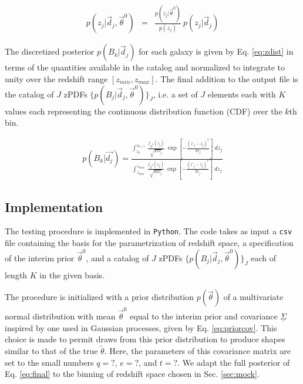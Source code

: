 \documentclass[preprint]{aastex}
\newcommand{\textul}{\underline}
\begin{document}
\begin{eqnarray}
\label{eq:interim}
p(z_{j}|\vec{d}_{j},\vec{\theta}^{0}) &=& \frac{p(z_{j}|\vec{\theta}^{0})}{p(z_{j})}\ p(z_{j}|\vec{d}_{j})
\end{eqnarray}

The discretized posterior $p(B_{k}|\vec{d}_{j})$ for each galaxy is given by Eq. \ref{eq:zdist} in terms of the quantities available in the catalog and normalized to integrate to unity over the redshift range $[z_{min},z_{max}]$.  The final addition to the output file is the catalog of $J$ zPDFs $\{p(B_{j}|\vec{d}_{j},\vec{\theta}^{0})\}_{J}$, i.e. a set of $J$ elements each with $K$ values each representing the continuous distribution function (CDF) over the $k$th bin.

\begin{eqnarray}
\label{eq:zdist}
p(B_{k}|\vec{d_{j}}) = \frac{\int_{z_{k}}^{z_{k+1}}\ \frac{f_{\vec{\theta}^{0}}(z_{j})}{\sqrt{2\pi v_{j}}}\ \exp\left[-\frac{(z'_{j}-z_{j})^{2}}{2v_{j}}\right]\ dz_{j}}{\int_{z_{min}}^{z_{max}}\ \frac{f_{\vec{\theta}^{0}}(z_{j})}{\sqrt{2\pi v_{j}}}\ \exp\left[-\frac{(z'_{j}-z_{j})^{2}}{2v_{j}}\right]\ dz_{j}}
\end{eqnarray}

\clearpage
\subsection{Implementation}
\label{sec:mcmc}

The testing procedure is implemented in \texttt{Python}.  The code takes as input a \texttt{csv} file containing the basis for the parametrization of redshift space, a specification of the interim prior $\vec{\theta}^{0}$, and a catalog of $J$ zPDFs $\{p(B_{j}|\vec{d}_{j},\vec{\theta}^{0})\}_{J}$ each of length $K$ in the given basis.  

The procedure is initialized with a prior distribution $p(\vec{\theta})$ of a multivariate normal distribution with mean $\vec{\theta}^{0}$ equal to the interim prior and covariance $\textul{\Sigma}$ inspired by one used in Gaussian processes, given by Eq. \ref{eq:priorcov}.  This choice is made to permit draws from this prior distribution to produce shapes similar to that of the true $\tilde{\theta}$.  Here, the parameters of this covariance matrix are set to the small numbers $q=?$, $e=?$, and $t=?$.  We adapt the full posterior of Eq. \ref{eq:final} to the binning of redshift space chosen in Sec. \ref{sec:mock}.
\end{document}
